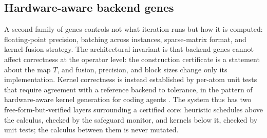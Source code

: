 \subsection{Hardware-aware backend genes}
\label{sec:hardware}
%

A second family of genes controls not what iteration runs but
how it is computed: floating-point precision, batching across
instances, sparse-matrix format, and kernel-fusion strategy. The
architectural invariant is that backend genes cannot affect correctness at
the operator level: the construction certificate is a statement about the
map $T$, and fusion, precision, and block sizes change only its
implementation. Kernel correctness is instead established by per-atom unit
tests that require agreement with a reference backend to tolerance, in the
pattern of hardware-aware kernel generation for coding agents
\citep{Hawkeye2026}. The system thus has two free-form-but-verified layers
surrounding a certified core: heuristic schedules above the calculus,
checked by the safeguard monitor, and kernels below it, checked by
unit tests; the calculus between them is never mutated.

